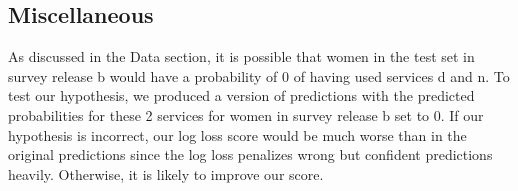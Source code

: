 \documentclass{article}\usepackage[]{graphicx}\usepackage[]{color}
\begin{document}
\subsection{Miscellaneous}                                                                                                                                                                                                                                                                                                                                                                                                                                                                                                                                                                                                As discussed in the Data section, it is possible that women in the test set in survey release b would have a probability of 0 of having used services d and n. To test our hypothesis, we produced a version of predictions with the predicted probabilities for these 2 services for women in survey release b set to 0. If our hypothesis is incorrect, our log loss score would be much worse than in the original predictions since the log loss penalizes wrong but confident predictions heavily. Otherwise, it is likely to improve our score.
                                                                                                                                                                                                                                                                                                                                                                                                                                                                                                                                                                                                
\end{document}
